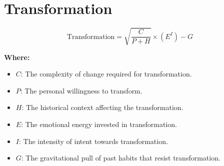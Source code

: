 \chapter{Transformation}

\begin{equation}
\text{Transformation} = \sqrt{\frac{C}{P + H}} \times (E^I) - G
\end{equation}

\textbf{Where:}

\begin{itemize}
    \item $C$: The complexity of change required for transformation.
    \item $P$: The personal willingness to transform.
    \item $H$: The historical context affecting the transformation.
    \item $E$: The emotional energy invested in transformation.
    \item $I$: The intensity of intent towards transformation.
    \item $G$: The gravitational pull of past habits that resist transformation.
\end{itemize}